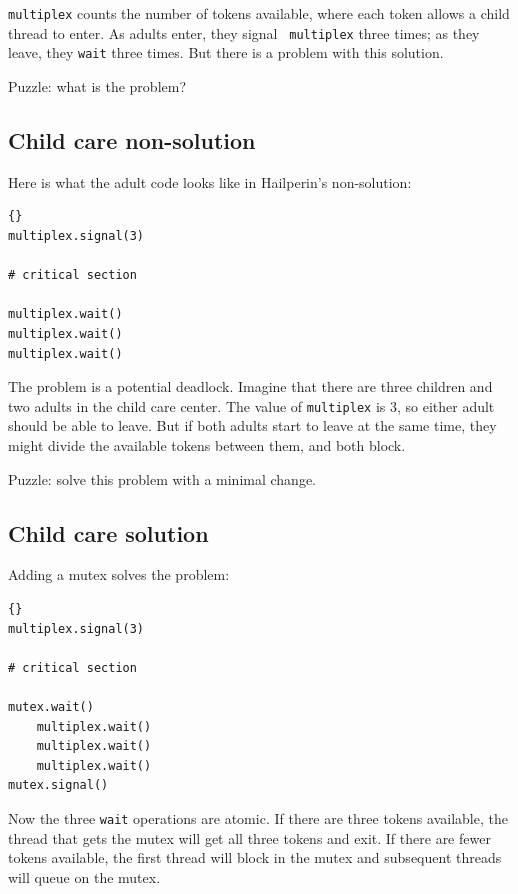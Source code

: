 \documentclass{book}
\newcommand{\clearemptydoublepage}{\newpage\cleardoublepage}
\begin{document}
{\tt multiplex} counts the number of tokens available, where each token
allows a child thread to enter.  As adults enter, they signal {\tt
multiplex} three times; as they leave, they {\tt wait} three times.
But there is a problem with this solution.

Puzzle: what is the problem?


\clearemptydoublepage
\subsection {Child care non-solution}

Here is what the adult code looks like in Hailperin's non-solution:

\begin{lstlisting}[title={Child care non-solution (adult)}]{}
multiplex.signal(3)

# critical section

multiplex.wait()
multiplex.wait()
multiplex.wait()
\end{lstlisting}

The problem is a potential deadlock.  Imagine that there are
three children and two adults in the child care center.  The
value of {\tt multiplex} is 3, so either adult should be able
to leave.  But if both adults start to leave at the same time,
they might divide the available tokens between them, and both
block.

Puzzle: solve this problem with a minimal change.


\clearemptydoublepage
\subsection {Child care solution}

Adding a mutex solves the problem:

\begin{lstlisting}[title={Child care solution (adult)}]{}
multiplex.signal(3)

# critical section

mutex.wait()
    multiplex.wait()
    multiplex.wait()
    multiplex.wait()
mutex.signal()
\end{lstlisting}

Now the three {\tt wait} operations are atomic.  If there
are three tokens available, the thread that gets the mutex
will get all three tokens and exit.  If there are fewer
tokens available, the first thread will block in the mutex
and subsequent threads will queue on the mutex.
\end{document}
